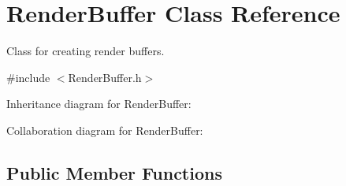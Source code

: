 \hypertarget{class_render_buffer}{\section{Render\-Buffer Class Reference}
\label{class_render_buffer}
}


Class for creating render buffers.  




{\ttfamily \#include $<$Render\-Buffer.\-h$>$}



Inheritance diagram for Render\-Buffer\-:


Collaboration diagram for Render\-Buffer\-:
\subsection*{Public Member Functions}
